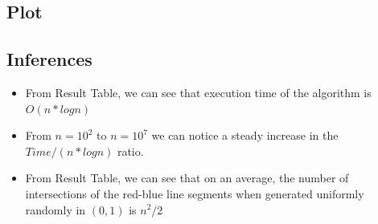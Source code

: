 \documentclass{article}
\begin{document}
\subsection{Plot}

\subsection{Inferences}
\begin{itemize}
\item From Result Table, we can see that execution time of the algorithm is $O(n*logn)$
\item From $n=10^2$ to $n=10^7$ we can notice a steady increase in the $Time/(n*log n)$ ratio. 
\item From Result Table, we can see that on an average, the number of intersections of the red-blue line segments when generated uniformly randomly in $(0,1)$ is $n^2/2$

\end{itemize}
\end{document}
